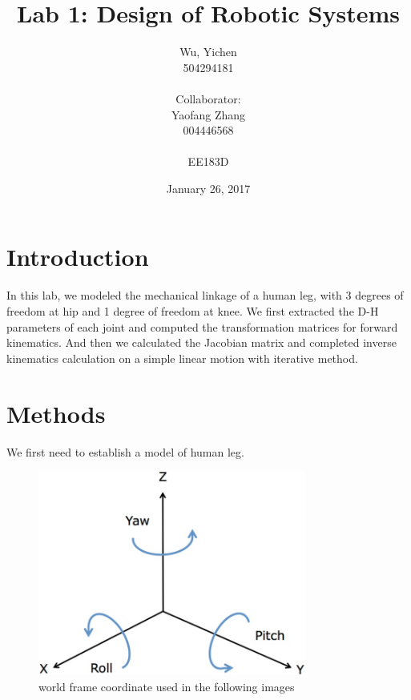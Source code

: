 \documentclass{article}
\begin{document}
\title{Lab 1: Design of Robotic Systems}
\date{January 26, 2017}
\author{Wu, Yichen \\504294181\\  \\Collaborator: \\Yaofang Zhang \\004446568\\ \\EE183D}

\maketitle

\section{Introduction}

In this lab, we modeled the mechanical linkage of a human leg, with 3 degrees of freedom at hip and 1 degree of freedom at knee. We first extracted the D-H parameters of each joint and computed the transformation matrices for forward kinematics. 
And then we calculated the Jacobian matrix and completed inverse kinematics calculation on a simple linear motion with iterative method.

\section{Methods}

We first need to establish a model of human leg.

\begin{figure}[H]
\centering
\includegraphics[width=250pt]{rpy}
\caption{world frame coordinate used in the following images}
\end{figure}
\end{document}
